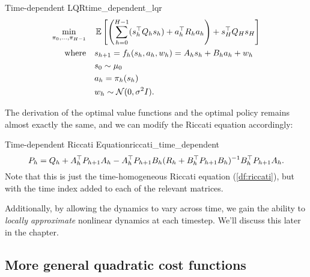 \documentclass[\main/main]{subfiles}
\begin{document}
\begin{definition}{Time-dependent LQR}{time_dependent_lqr}
    \begin{align*}
        \min_{\pi_{0}, \dots, \pi_{H-1}} \quad & \operatorname*{\mathbb{E}} \left[ \left( \sum_{h=0}^{H-1} (s_h^\top Q_h s_h) + a_h^\top R_h a_h \right) + s_H^\top Q_H s_H \right] \\
        \textrm{where} \quad                      & s_{h+1} = f_h(s_h, a_h, w_h) = A_h s_h + B_h a_h + w_h                                                             \\
                                                  & s_0 \sim \mu_0                                                                                                                                   \\
                                                  & a_h = \pi_h (s_h)                                                                                                                       \\
                                                  & w_h \sim \mathcal{N}(0, \sigma^2 I).
    \end{align*}
\end{definition}

The derivation of the optimal value functions and the optimal policy remains almost exactly the same,
and we can modify the Riccati equation accordingly:

\begin{definition}{Time-dependent Riccati Equation}{riccati_time_dependent}
    \[
        P_h = Q_h + A_h^\top P_{h+1} A_h - A_h^\top P_{h+1} B_h (R_h + B_h^\top P_{h+1} B_h)^{-1} B_h^\top P_{h+1} A_h.
    \]
    Note that this is just the time-homogeneous Riccati equation (\autoref{df:riccati}),
    but with the
    time index added to each of the relevant matrices.
\end{definition}

Additionally, by allowing the dynamics to vary across time,
we gain the ability to \emph{locally approximate} nonlinear dynamics at each timestep.
We'll discuss this later in the chapter.

\subsection[General quadratic cost]{More general quadratic cost functions}
\end{document}
